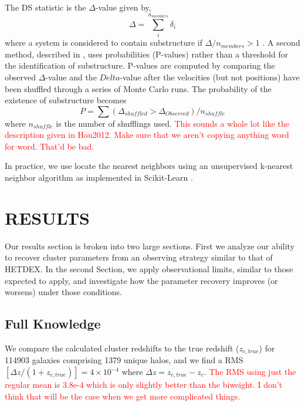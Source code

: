 \documentclass[apj, revtex4]{emulateapj}
\newcommand{\editorial}[1]{\textcolor{red}{#1}}
\begin{document}
The DS statistic is the $\Delta$-value given by, 
\begin{equation}
	\Delta = \sum^{n_{members}}_i \delta_i
\end{equation}
where a system is considered to contain substructure if $\Delta/n_{members} > 1$ \citep{Dressler1988}. A second method, described in \cite{Hou2012}, uses probabilities (P-values) rather than a threshold for the identification of substructure. P-values are computed by comparing the observed $\Delta$-value and the $Delta$-value after the velocities (but not positions) have been shuffled through a series of Monte Carlo runs. The probability of the existence of substructure becomes
\begin{equation}
	P = \sum (\Delta_{shuffled} > \Delta_{Observed}) / n_{shuffle}
\end{equation}
where $n_{shuffle}$ is the number of shufflings used. \editorial{This sounds a whole lot like the description given in Hou2012. Make sure that we aren't copying anything word for word. That'd be bad.}

In practice, we use locate the nearest neighbors using an unsupervised k-nearest neighbor algorithm as implemented in Scikit-Learn \citep{Pedregosa2012}. 

\section{RESULTS}
Our results section is broken into two large sections. First we analyze our ability to recover cluster parameters from an observing strategy similar to that of HETDEX. In the second Section, we apply observational limits, similar to those expected to apply, and investigate how the parameter recovery improves (or worsens) under those conditions. 

\subsection{Full Knowledge}
We compare the calculated cluster redshifts to the true redshift ($z_{c,true}$) for 114903 galaxies comprising 1379 unique halos, and we find a RMS$[\Delta z/(1+z_{c,true})]= 4\times 10^{-4}$ where $\Delta z = z_{c,true} - z_{c}$. \editorial{The RMS using just the regular mean is 3.8e-4 which is only slightly better than the biweight. I don't think that will be the case when we get more complicated things.}
\end{document}
